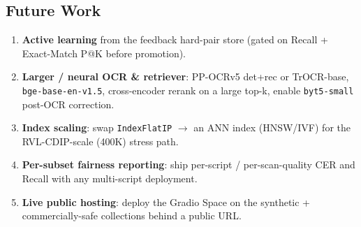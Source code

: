 \documentclass[12pt,a4paper]{article}
\begin{document}
\subsection{Future Work}

\begin{enumerate}\setlength\itemsep{0.12em}
  \item \textbf{Active learning} from the feedback hard-pair store (gated on Recall + Exact-Match P@K before promotion).
  \item \textbf{Larger / neural OCR \& retriever}: PP-OCRv5 det+rec or TrOCR-base, \texttt{bge-base-en-v1.5}, cross-encoder rerank on a large top-k, enable \texttt{byt5-small} post-OCR correction.
  \item \textbf{Index scaling}: swap \texttt{IndexFlatIP} $\rightarrow$ an ANN index (HNSW/IVF) for the RVL-CDIP-scale (400K) stress path.
  \item \textbf{Per-subset fairness reporting}: ship per-script / per-scan-quality CER and Recall with any multi-script deployment.
  \item \textbf{Live public hosting}: deploy the Gradio Space on the synthetic + commercially-safe collections behind a public URL.
\end{enumerate}
\end{document}
